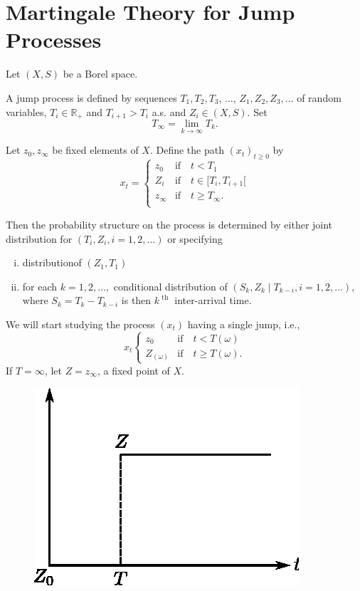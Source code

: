 \setcounter{section}{0}
\section{Martingale Theory for Jump Processes}\label{chap1:sec1}%

Let $(X, S)$ be a Borel space.

\begin{defn}%
  A jump process is defined by sequences  $ T_1, T_2, T_3$, $\ldots$,
  $Z_1, Z_2, Z_3,  \ldots $ of random variables,  $ T_i \in 
  \mathbb{R}_+ $ and   $ T_{i+1} > T_i$ a.s. and  $ Z_i \in 
  (X,S)$. Set  
  $$
  T_{\infty} = \lim_{ k \rightarrow \infty}  T_k.
  $$
\end{defn}

Let $z_0, z_\infty  $  be  fixed elements of $X$. Define the path $
(x_t)_{t \geq 0}$ by 
$$
x_t =  
\begin{cases}
  z_0  & \text{if} \quad  t < T_1 \\
  Z_i  & \text{if} \quad t \in  [T_i, T_{i+1} [ \\
  z_\infty  & \text{if} \quad t \ge T_\infty. \\
\end{cases}
$$

Then the probability structure on the process is determined by either
joint distribution for $ (T_i, Z_i, i = 1,2, \ldots) $ or
specifying  
\begin{enumerate}[(i)]
\item  distribution\pageoriginale of $(Z_1, T_1) $ 
\item for each $ k = 1,2, \ldots, $ conditional distribution of  $
  (S_k, Z_k \mid T_{k-i}, i = 1, 2, \ldots )$, where  $ S_k =
  T_k-T_{k-i} $  is  then $ k^{\text{ th }} $  inter-arrival time. 
\end{enumerate}

We will start  studying  the  process  $(x_t) $ having a single jump,
i.e., 
$$
x_t
\begin{cases} 
  z_0 & \text{if} \quad  t < T (\omega)\\
  Z_{(\omega)}  & \text{if} \quad  t \ge  T (\omega).
\end{cases}
$$
If  $T=\infty $, let $Z= z_\infty $, a fixed point of $X$.

\begin{figure}[H]
\centering
\includegraphics{vol75-figures/fig2.eps}
\caption{}\label{chap1:fig1.2}
\end{figure}

